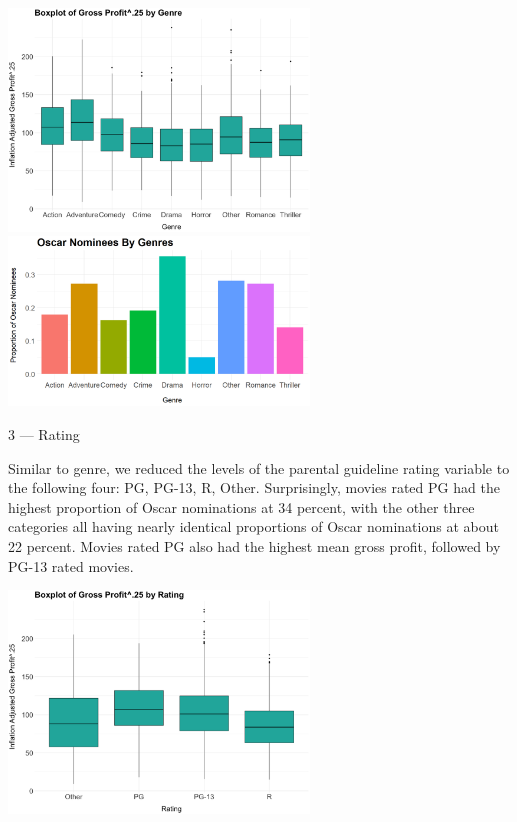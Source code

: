 \documentclass[10pt]{article}
\begin{document}
\begin{center}
\includegraphics[width=8cm]{_assets/_eda/genre_iagp_bp.png}
\hspace{1cm}
\includegraphics[width=8cm]{_assets/_eda/on_by_genre.png}

\end{center}

3 --- Rating

Similar to genre, we reduced the levels of the parental guideline rating variable to the following four: PG, PG-13, R, Other. Surprisingly, movies rated PG had the highest proportion of Oscar nominations at 34 percent, with the other three categories all having nearly identical proportions of Oscar nominations at about 22 percent. Movies rated PG also had the highest mean gross profit, followed by PG-13 rated movies. 

\begin{center}
\includegraphics[width=8cm]{_assets/_eda/rating_iagp_bp.png}

\end{center}
\end{document}
